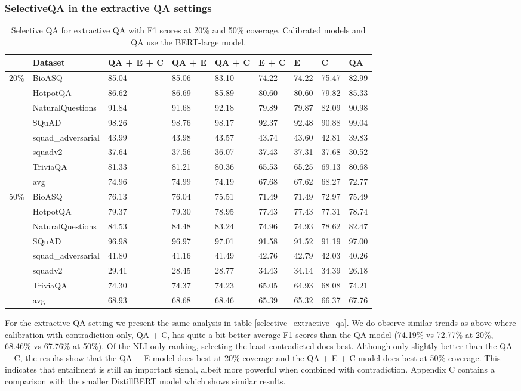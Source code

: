 \documentclass[11pt]{article}
\begin{document}
\subsubsection{SelectiveQA in the extractive QA settings}
\begin{table*}[]
\centering
\begin{tabular}{lllllllll}
\hline
 & Dataset & QA + E + C & QA + E & QA + C & E + C & E & C & QA \\ \hline
20\% & BioASQ & 85.04 & 85.06 & 83.10 & 74.22 & 74.22 & 75.47 & 82.99 \\
 & HotpotQA & 86.62 & 86.69 & 85.89 & 80.60 & 80.60 & 79.82 & 85.33 \\
 & NaturalQuestions & 91.84 & 91.68 & 92.18 & 79.89 & 79.87 & 82.09 & 90.98 \\
 & SQuAD & 98.26 & 98.76 & 98.17 & 92.37 & 92.48 & 90.88 & 99.04 \\
 & squad\_adversarial & 43.99 & 43.98 & 43.57 & 43.74 & 43.60 & 42.81 & 39.83 \\
 & squadv2 & 37.64 & 37.56 & 36.07 & 37.43 & 37.31 & 37.68 & 30.52 \\
 & TriviaQA & 81.33 & 81.21 & 80.36 & 65.53 & 65.25 & 69.13 & 80.68 \\
 & avg & 74.96 & 74.99 & 74.19 & 67.68 & 67.62 & 68.27 & 72.77 \\
50\% & BioASQ & 76.13 & 76.04 & 75.51 & 71.49 & 71.49 & 72.97 & 75.49 \\
 & HotpotQA & 79.37 & 79.30 & 78.95 & 77.43 & 77.43 & 77.31 & 78.74 \\
 & NaturalQuestions & 84.53 & 84.48 & 83.24 & 74.96 & 74.93 & 78.62 & 82.47 \\
 & SQuAD & 96.98 & 96.97 & 97.01 & 91.58 & 91.52 & 91.19 & 97.00 \\
 & squad\_adversarial & 41.80 & 41.16 & 41.49 & 42.76 & 42.79 & 42.03 & 40.26 \\
 & squadv2 & 29.41 & 28.45 & 28.77 & 34.43 & 34.14 & 34.39 & 26.18 \\
 & TriviaQA & 74.30 & 74.37 & 74.23 & 65.05 & 64.93 & 68.08 & 74.21 \\
 & avg & 68.93 & 68.68 & 68.46 & 65.39 & 65.32 & 66.37 & 67.76 \\ \hline
\end{tabular}
\caption{Selective QA for extractive QA with F1 scores at 20\% and 50\% coverage. Calibrated models and QA use the BERT-large model.}
\label{tab:selective_extractive_qa}
\end{table*}
For the extractive QA setting we present the same analysis in table \ref{selective_extractive_qa}. We do observe similar trends as above where calibration with contradiction only, QA + C, has quite a bit better average F1 scores than the QA model (74.19\% vs 72.77\% at 20\%, 68.46\% vs 67.76\% at 50\%). Of the NLI-only ranking, selecting the least contradicted does best. Although only slightly better than the QA + C, the results show that the QA + E model does best at 20\% coverage and the QA + E + C model does best at 50\% coverage. This indicates that entailment is still an important signal, albeit more powerful when combined with contradiction. Appendix C contains a comparison with the smaller DistillBERT model which shows similar results.
\end{document}
